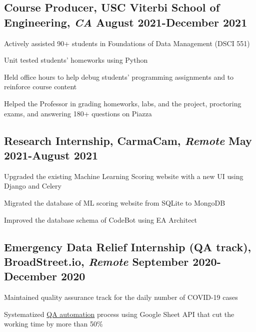 \documentclass[11pt]{article}
\begin{document}
\subsection*{Course Producer{\normalfont, USC Viterbi School of Engineering,
            \textit{CA} \hfill
            August 2021-December 2021}}
\begin{compactitem}
    \item Actively assisted 90+ students in Foundations of Data Management
    (DSCI 551)
    \item Unit tested students' homeworks using Python
    \item Held office hours to help debug students' programming assignments
    and to reinforce
    course content
    \item Helped the Professor in grading homeworks, labs, and the project,
    proctoring exams, and
    answering 180+ questions on Piazza
\end{compactitem}

\subsection*{Research Internship{\normalfont, CarmaCam, \textit{Remote} \hfill May 2021-August 2021}}
\begin{compactitem}
    \item Upgraded the existing Machine Learning Scoring website with a new UI using Django and Celery
	\item Migrated the database of ML scoring website from SQLite to MongoDB
	\item Improved the database schema of CodeBot using EA Architect
\end{compactitem}

\subsection*{Emergency Data Relief Internship (QA track){\normalfont, BroadStreet.io, \textit{Remote} \hfill September 2020-December 2020}}
\begin{compactitem}
    \item Maintained quality assurance track for the daily number of COVID-19 cases
    \item Systematized \href{https://github.com/Anthonyive/broadstreet-qa-automation.git}{QA automation}
    process using Google Sheet API that cut the working time by more than
    50\%
\end{compactitem}
\end{document}

